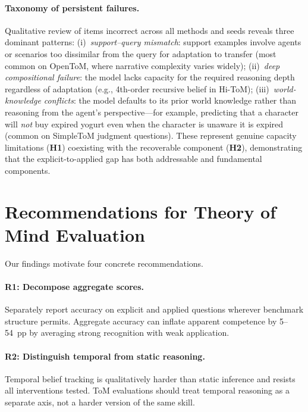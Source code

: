 \paragraph{Taxonomy of persistent failures.}
Qualitative review of items incorrect across all methods and seeds reveals three dominant patterns:
(i)~\emph{support--query mismatch}: support examples involve agents or scenarios too dissimilar from the query for adaptation to transfer (most common on OpenToM, where narrative complexity varies widely);
(ii)~\emph{deep compositional failure}: the model lacks capacity for the required reasoning depth regardless of adaptation (e.g., 4th-order recursive belief in Hi-ToM);
(iii)~\emph{world-knowledge conflicts}: the model defaults to its prior world knowledge rather than reasoning from the agent's perspective---for example, predicting that a character will \emph{not} buy expired yogurt even when the character is unaware it is expired (common on SimpleToM judgment questions).
These represent genuine capacity limitations (\textbf{H1}) coexisting with the recoverable component (\textbf{H2}), demonstrating that the explicit-to-applied gap has both addressable and fundamental components.


\section{Recommendations for Theory of Mind Evaluation}
\label{sec:recommendations}

Our findings motivate four concrete recommendations.

\paragraph{R1: Decompose aggregate scores.}
Separately report accuracy on explicit and applied questions wherever benchmark structure permits.
Aggregate accuracy can inflate apparent competence by 5--54~pp by averaging strong recognition with weak application.

\paragraph{R2: Distinguish temporal from static reasoning.}
Temporal belief tracking is qualitatively harder than static inference and resists all interventions tested.
ToM evaluations should treat temporal reasoning as a separate axis, not a harder version of the same skill.

